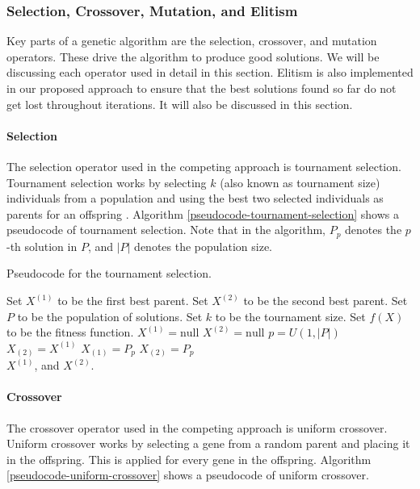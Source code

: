 \subsubsection{Selection, Crossover, Mutation, and Elitism}
Key parts of a genetic algorithm are the selection, crossover, and mutation operators. These drive the algorithm to produce good solutions. We will be discussing each operator used in detail in this section. Elitism is also implemented in our proposed approach to ensure that the best solutions found so far do not get lost throughout iterations. It will also be discussed in this section.

\paragraph{Selection}
The selection operator used in the competing approach is tournament selection. Tournament selection works by selecting $k$ (also known as tournament size) individuals from a population and using the best two selected individuals as parents for an offspring \cite{StackOverflow-TournamentSelection}. Algorithm \ref{pseudocode-tournament-selection} shows a pseudocode of tournament selection. Note that in the algorithm, $P_{p}$ denotes the $p$-th solution in $P$, and $|P|$ denotes the population size.

\begin{algorithm}
\caption{Pseudocode for the tournament selection.}
\label{pseudocode-tournament-selection}
\begin{algorithmic}[1]
\State Set $X^{(1)}$ to be the first best parent.
\State Set $X^{(2)}$ to be the second best parent.
\State Set $P$ to be the population of solutions.
\State Set $k$ to be the tournament size.
\State Set $f(X)$ to be the fitness function.
\State $X^{(1)} = \text{null}$
\State $X^{(2)} = \text{null}$
	\State $p = U(1, |P|)$
		\State $X_{(2)} = X^{(1)}$
		\State $X_{(1)} = P_{p}$
		\State $X_{(2)} = P_{p}$
	\EndIf
\EndFor \\
\Return $X^{(1)}$, and $X^{(2)}$.
\end{algorithmic}
\end{algorithm}

\paragraph{Crossover}
The crossover operator used in the competing approach is uniform crossover. Uniform crossover works by selecting a gene from a random parent and placing it in the offspring. This is applied for every gene in the offspring. Algorithm \ref{pseudocode-uniform-crossover} shows a pseudocode of uniform crossover.

